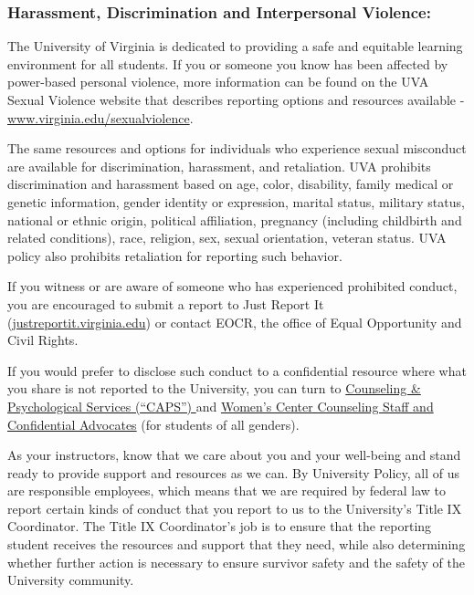 \documentclass[11pt, a4paper]{article}
\begin{document}
\subsubsection*{Harassment, Discrimination and Interpersonal Violence:}
The University of Virginia is dedicated to providing a safe and equitable learning environment for all students. If you or someone you know has been affected by power-based personal violence, more information can be found on the UVA Sexual Violence website that describes reporting options and resources available - \href{http://www.virginia.edu/sexualviolence}{www.virginia.edu/sexualviolence}.

The same resources and options for individuals who experience sexual misconduct are available for discrimination, harassment, and retaliation. UVA prohibits discrimination and harassment based on age, color, disability, family medical or genetic information, gender identity or expression, marital status, military status, national or ethnic origin, political affiliation, pregnancy (including childbirth and related conditions), race, religion, sex, sexual orientation, veteran status. UVA policy also prohibits retaliation for reporting such behavior.

If you witness or are aware of someone who has experienced prohibited conduct, you are encouraged to submit a report to Just Report It (\href{http://justreportit.virginia.edu}{justreportit.virginia.edu}) or contact EOCR, the office of Equal Opportunity and Civil Rights.

If you would prefer to disclose such conduct to a confidential resource where what you share is not reported to the University, you can turn to \href{https://mentalhealthservices.studenthealth.virginia.edu/}{Counseling \& Psychological Services (“CAPS”) } and \href{https://womenscenter.virginia.edu/}{Women’s Center Counseling Staff and Confidential Advocates} (for students of all genders).

As your instructors, know that we care about you and your well-being and stand ready to provide support and resources as we can. By University Policy, all of us are responsible employees, which means that we are required by federal law to report certain kinds of conduct that you report to us to the University's Title IX Coordinator. The Title IX Coordinator's job is to ensure that the reporting student receives the resources and support that they need, while also determining whether further action is necessary to ensure survivor safety and the safety of the University community.
\end{document}
